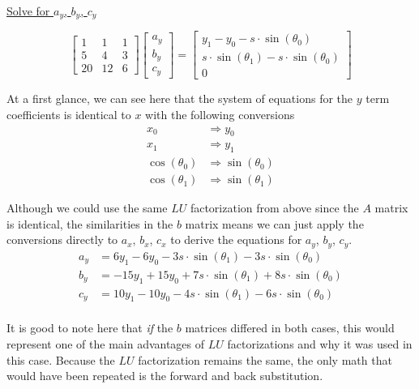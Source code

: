 \documentclass[12pt, letterpaper]{article}
\begin{document}
\newpage 
\underline{Solve for \(a_y\), \(b_y\), \(c_y\)}

\begin{equation*}
\begin{bmatrix}
1 & 1 & 1 \\
5 & 4 & 3 \\
20 & 12 & 6
\end{bmatrix}
\begin{bmatrix}
a_y \\ b_y \\ c_y
\end{bmatrix}
= \begin{bmatrix}
y_1 - y_0 - s \cdot \sin(\theta_0) \\
s \cdot \sin(\theta_1) - s \cdot \sin(\theta_0) \\
0
\end{bmatrix}
\end{equation*}

At a first glance, we can see here that the system of equations for the \(y\) term coefficients is identical to \(x\) with the following conversions 
\begin{align*}
x_0 &\Rightarrow y_0 \\
x_1 &\Rightarrow y_1 \\
\cos(\theta_0) &\Rightarrow \sin(\theta_0) \\
\cos(\theta_1) &\Rightarrow \sin(\theta_1)
\end{align*}

Although we could use the same \(LU\) factorization from above since the \(A\) matrix is identical, the similarities in the \(b\) matrix means we can just apply the conversions directly to \(a_x\), \(b_x\), \(c_x\) to derive the equations for \(a_y\), \(b_y\), \(c_y\).
\begin{align}
a_y &= 6y_1 - 6y_0 - 3s \cdot \sin(\theta_1) - 3s \cdot \sin(\theta_0) \\
b_y &= -15y_1 + 15y_0 + 7s \cdot \sin(\theta_1) + 8s \cdot \sin(\theta_0) \\
c_y &= 10y_1 - 10y_0 - 4s \cdot \sin(\theta_1) - 6s \cdot \sin(\theta_0) \\
\nonumber
\end{align}

It is good to note here that \textit{if} the \(b\) matrices differed in both cases, this would represent one of the main advantages of \(LU\) factorizations and why it was used in this case. Because the \(LU\) factorization remains the same, the only math that would have been repeated is the forward and back substitution.  
\end{document}
